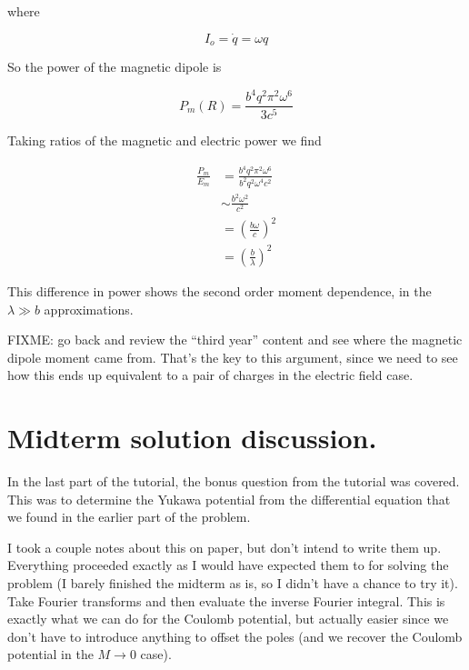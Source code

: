 where 

\begin{equation}\label{eqn:relativisticElectrodynamicsT8:310}
I_o = \dot{q} = \omega q
\end{equation}

So the power of the magnetic dipole is 

\begin{equation}\label{eqn:relativisticElectrodynamicsT8:330}
P_m(R) = \frac{b^4 q^2 \pi^2 \omega^6}{3 c^5}
\end{equation}

Taking ratios of the magnetic and electric power we find

\begin{align*}
\frac{P_m}{E_m} 
&= \frac{b^4 q^2 \pi^2 \omega^6}{b^2 q^2 \omega^4 c^2}  \\
&\sim \frac{b^2 \omega^2}{c^2} \\
&= \left(\frac{b \omega}{c}\right)^2 \\
&= \left(\frac{b }{\lambda}\right)^2 
\end{align*}

This difference in power shows the second order moment dependence, in the $\lambda \gg b$ approximations.

FIXME: go back and review the ``third year'' content and see where the magnetic dipole moment came from.  That's the key to this argument, since we need to see how this ends up equivalent to a pair of charges in the electric field case.

\section{Midterm solution discussion.}

In the last part of the tutorial, the bonus question from the tutorial was covered.  This was to determine the Yukawa potential from the differential equation that we found in the earlier part of the problem.

I took a couple notes about this on paper, but don't intend to write them up.  Everything proceeded exactly as I would have expected them to for solving the problem (I barely finished the midterm as is, so I didn't have a chance to try it).  Take Fourier transforms and then evaluate the inverse Fourier integral.  This is exactly what we can do for the Coulomb potential, but actually easier since we don't have to introduce anything to offset the poles (and we recover the Coulomb potential in the $M \rightarrow 0$ case).

